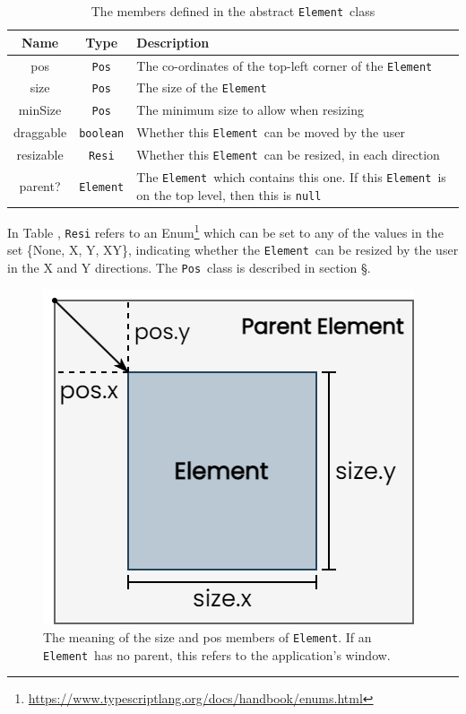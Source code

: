 \documentclass[12pt,a4paper,twoside,openright]{report}
\newcommand{\element}{\texttt{Element}}
\newcommand{\pos}{\texttt{Pos}}
\begin{document}
\begin{table}[h]
    \centering
    \begin{tabular}{c|c|p{300pt}}
        Name & Type & Description \\
        \hline
        pos & \pos & The co-ordinates of the top-left corner of the \element\\
        size & \pos & The size of the \element\\
        minSize & \pos & The minimum size to allow when resizing\\
        draggable & \verb|boolean| & Whether this \element\ can be moved by the user\\ 
        resizable & \verb|Resi| & Whether this \element\ can be resized, in each direction\\
        parent? & \element & The \element\ which contains this one. If this \element\ is on the top level, then this is \verb|null|\\
    \end{tabular}
    \caption{The members defined in the abstract \element\ class}
    \label{tab:element_members}
\end{table}

In Table , \verb|Resi| refers to an Enum\footnote{\url{https://www.typescriptlang.org/docs/handbook/enums.html}} which can be set to any of the values in the set \{None, X, Y, XY\}, indicating whether the \element\ can be resized by the user in the X and Y directions. The \pos\ class is described in section \S{}.

\begin{figure}[h]
    \centering
    \includegraphics[scale=0.6]{images/element_demonstration.png}
    \caption{The meaning of the size and pos members of \element. If an \element\ has no parent, this refers to the application's window.}
    \label{fig:element_demo}
\end{figure}
\end{document}
